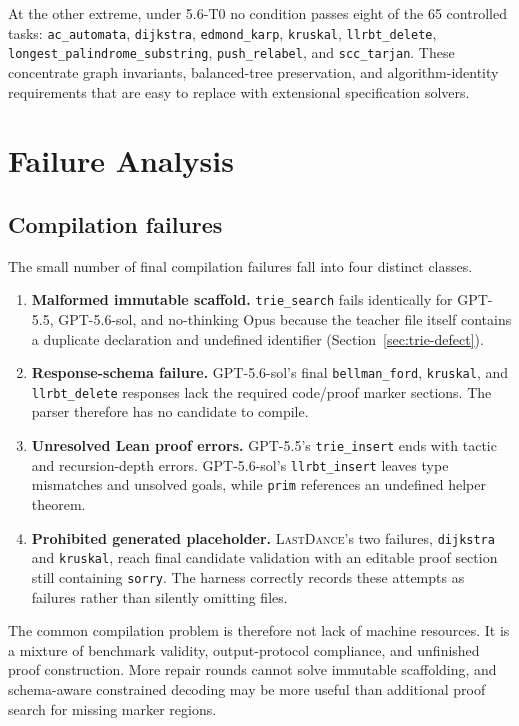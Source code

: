 \documentclass{article}
\newcommand{\task}[1]{\texttt{#1}}
\newcommand{\lastdance}{\textsc{LastDance}}
\begin{document}
At the other extreme, under 5.6-T0 no condition passes eight of the 65 controlled tasks:
\task{ac\_automata}, \task{dijkstra}, \task{edmond\_karp}, \task{kruskal},
\task{llrbt\_delete}, \task{longest\_palindrome\_substring}, \task{push\_relabel}, and
\task{scc\_tarjan}.  These concentrate graph invariants, balanced-tree preservation,
and algorithm-identity requirements that are easy to replace with extensional
specification solvers.

\section{Failure Analysis}

\subsection{Compilation failures}

The small number of final compilation failures fall into four distinct classes.

\begin{enumerate}[leftmargin=*,itemsep=3pt]
  \item \textbf{Malformed immutable scaffold.}  \task{trie\_search} fails identically
        for GPT-5.5, GPT-5.6-sol, and no-thinking Opus because the teacher file itself
        contains a duplicate declaration and undefined identifier
        (Section~\ref{sec:trie-defect}).
  \item \textbf{Response-schema failure.}  GPT-5.6-sol's final
        \task{bellman\_ford}, \task{kruskal}, and \task{llrbt\_delete} responses lack
        the required code/proof marker sections.  The parser therefore has no candidate
        to compile.
  \item \textbf{Unresolved Lean proof errors.}  GPT-5.5's \task{trie\_insert} ends with
        tactic and recursion-depth errors.  GPT-5.6-sol's \task{llrbt\_insert} leaves
        type mismatches and unsolved goals, while \task{prim} references an undefined
        helper theorem.
  \item \textbf{Prohibited generated placeholder.}  \lastdance's two failures,
        \task{dijkstra} and \task{kruskal}, reach final candidate validation with an
        editable proof section still containing \texttt{sorry}.  The harness correctly
        records these attempts as failures rather than silently omitting files.
\end{enumerate}

The common compilation problem is therefore not lack of machine resources.  It is a
mixture of benchmark validity, output-protocol compliance, and unfinished proof
construction.  More repair rounds cannot solve immutable scaffolding, and schema-aware
constrained decoding may be more useful than additional proof search for missing marker
regions.
\end{document}
